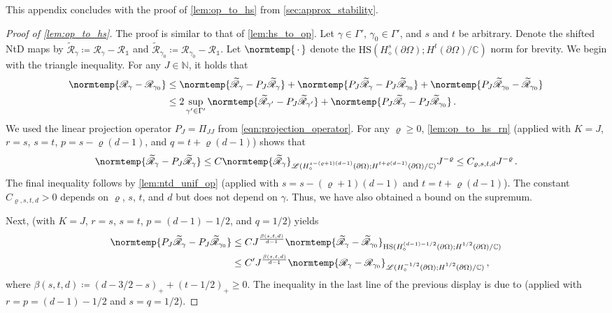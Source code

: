 \documentclass[pdflatex,sn-mathphys-num]{sn-jnl-preprint}
\newcommand{\N}{\mathbb{N}}
\newcommand{\C}{\mathbb{C}}
\newcommand{\sL}{\mathscr{L}}
\newcommand{\sR}{\mathscr{R}}
\newcommand{\pOmega}{{\partial\Omega}}
\newcommand{\ntd}{\mathscr{R}_{\gamma}}
\newcommand{\ntdz}{\mathscr{R}_{\gamma_0}}
\newcommand{\tntd}{\widetilde{\mathscr{R}}_{\gamma}}
\newcommand{\tntdz}{\widetilde{\mathscr{R}}_{\gamma_0}}
\newcommand{\norm}{\normtemp}
\newcommand{\defeq}{\coloneqq} %
\newcommand{\HS}{\mathrm{HS}} %
\newcommand{\onebm}{\mathds{1}} %
\newcommand{\slot}{{\,\cdot\,}}
\theoremstyle{thmstyleone}%
\theoremstyle{thmstyletwo}%
\theoremstyle{thmstylethree}%
\numberwithin{equation}{section}
\numberwithin{theorem}{section}
\begin{document}
\begin{appendices}
This appendix concludes with the proof of \cref{lem:op_to_hs} from \cref{sec:approx_stability}.
\begin{proof}[Proof of \cref{lem:op_to_hs}]
    The proof is similar to that of \cref{lem:hs_to_op}. 
	Let $\gamma\in\Gamma'$, $\gamma_0\in\Gamma'$, and $s$ and $t$ be arbitrary. Denote the shifted NtD maps by $\tntd\defeq \ntd-\sR_{\onebm}$ and $\tntdz\defeq \ntdz - \sR_{\onebm}$. Let $\norm{\slot}$ denote the $\HS(H^s_\diamond(\pOmega);H^t(\pOmega)/\C)$ norm for brevity. We begin with the triangle inequality. For any $J\in\N$, it holds that
	\begin{align*}
		\norm{\ntd-\sR_{\gamma_0}} &\leq \norm{{\tntd} - P_{J}\tntd} + \norm{P_{J}\tntd - P_{J}\tntdz}  + \norm{P_{J}\tntdz - \tntdz}\\
		&\leq 2\sup_{\gamma'\in\Gamma'}\norm{\widetilde{\sR}_{\gamma'} - P_{J}\widetilde{\sR}_{\gamma'}} + \norm{P_{J}\tntd - P_J\tntdz}\,.
	\end{align*}
	We used the linear projection operator $P_J=\Pi_{JJ}$ from \eqref{eqn:projection_operator}. For any $\varrho \geq 0$, \cref{lem:op_to_hs_rn} (applied with $K=J$, $r=s$, $s=t$, $p=s-\varrho(d-1)$, and $q=t+\varrho(d-1)$) shows that
	\begin{align*}
		\norm{{\tntd} - P_J\tntd}\leq C \norm{\tntd}_{\sL(H^{s-(\varrho+1)(d-1)}_\diamond(\pOmega);H_{\phantom{\diamond}}^{t+\varrho(d-1)}(\pOmega)/\C)} J^{-\varrho}\leq C_{\varrho,s,t,d} J^{-\varrho}\,.
	\end{align*}
	The final inequality follows by \cref{lem:ntd_unif_op} (applied with $s=s-(\varrho+1)(d-1)$ and $t=t+\varrho(d-1)$). The constant $C_{\varrho,s,t,d}>0$ depends on $\varrho$, $s$, $t$, and $d$ but does not depend on $\gamma$. Thus, we have also obtained a bound on the supremum.
    
    Next,  (with $K=J$, $r=s$, $s=t$, $p=(d-1)-1/2$, and $q=1/2$) yields
	\begin{align*}
		\norm{P_J\tntd - P_J\tntdz}&\leq C J^{\frac{\beta(s,t,d)}{d-1}}\norm{\tntd -\tntdz}_{\HS(H^{(d-1)-1/2}_\diamond(\pOmega);H_{\phantom{\diamond}}^{1/2}(\pOmega)/\C)}\\
		&\leq C' J^{\frac{\beta(s,t,d)}{d-1}}\norm{\ntd -\ntdz}_{\sL(H^{-1/2}_\diamond(\pOmega);H_{\phantom{\diamond}}^{1/2}(\pOmega)/\C)}\,,
	\end{align*}
	where $\beta(s,t,d)\defeq (d-3/2-s)_+ + (t-1/2)_+\geq 0$. The inequality in the last line of the previous display is due to  (applied with $r=p=(d-1)-1/2$ and $s=q=1/2$). 
    

\end{proof}
\end{appendices}
\end{document}
